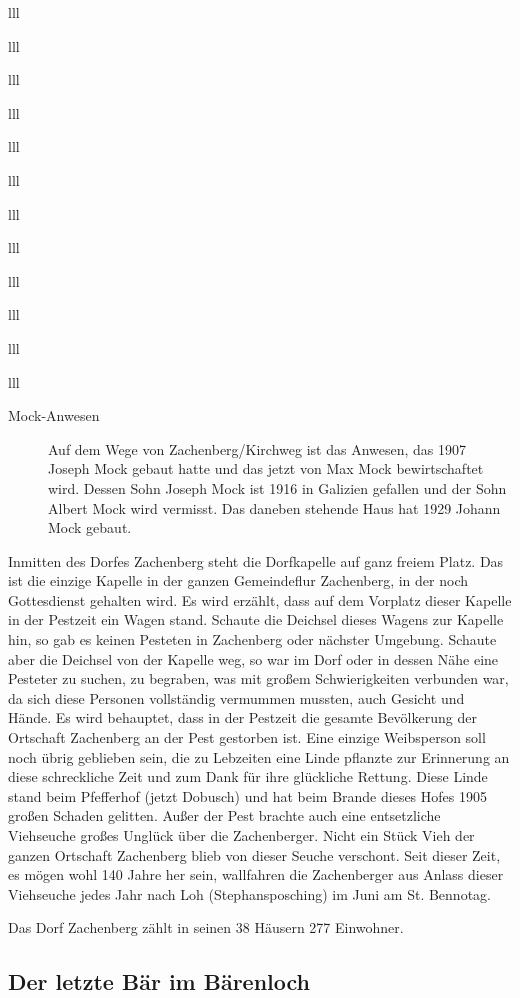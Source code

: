 \documentclass[12pt,a4pager]{book}
\begin{document}
\begin{tabuluar}{lll}
\begin{tabuluar}{lll}
\begin{tabuluar}{lll}
\begin{tabuluar}{lll}
\begin{tabuluar}{lll}
\begin{tabuluar}{lll}
\begin{tabuluar}{lll}
\begin{tabuluar}{lll}
\begin{tabuluar}{lll}
\begin{tabuluar}{lll}
\begin{tabuluar}{lll}
\begin{tabuluar}{lll}
\begin{description}
\item[Mock-Anwesen] Auf dem Wege von Zachenberg/Kirchweg ist das Anwesen, das
1907 Joseph Mock gebaut hatte und das jetzt von Max Mock bewirtschaftet wird.
Dessen Sohn Joseph Mock ist 1916 in Galizien gefallen und der Sohn Albert Mock
wird vermisst. Das daneben stehende Haus hat 1929 Johann Mock gebaut.
\end{description}

Inmitten des Dorfes Zachenberg steht die Dorfkapelle auf ganz freiem Platz. Das
ist die einzige Kapelle in der ganzen Gemeindeflur Zachenberg, in der noch
Gottesdienst gehalten wird. Es wird erzählt, dass auf dem Vorplatz dieser
Kapelle in der Pestzeit ein Wagen stand. Schaute die Deichsel dieses Wagens zur
Kapelle hin, so gab es keinen Pesteten in Zachenberg oder nächster Umgebung.
Schaute aber die Deichsel von der Kapelle weg, so war im Dorf oder in dessen
Nähe eine Pesteter zu suchen, zu begraben, was mit großem Schwierigkeiten
verbunden war, da sich diese Personen vollständig vermummen mussten, auch
Gesicht und Hände. Es wird behauptet, dass in der Pestzeit die gesamte
Bevölkerung der Ortschaft Zachenberg an der Pest gestorben ist. Eine einzige
Weibsperson soll noch übrig geblieben sein, die zu Lebzeiten eine Linde pflanzte
zur Erinnerung an diese schreckliche Zeit und zum Dank für ihre glückliche
Rettung. Diese Linde stand beim Pfefferhof (jetzt Dobusch) und hat beim Brande
dieses Hofes 1905 großen Schaden gelitten. Außer der Pest brachte auch eine
entsetzliche Viehseuche großes Unglück über die Zachenberger. Nicht ein Stück
Vieh der ganzen Ortschaft Zachenberg blieb von dieser Seuche verschont. Seit
dieser Zeit, es mögen wohl 140 Jahre her sein, wallfahren die Zachenberger aus
Anlass dieser Viehseuche jedes Jahr nach Loh (Stephansposching) im Juni am St.
Bennotag.

Das Dorf Zachenberg zählt in seinen 38 Häusern 277 Einwohner.

\subsection{Der letzte Bär im Bärenloch}


\end{tabuluar}
\end{tabuluar}
\end{tabuluar}
\end{tabuluar}
\end{tabuluar}
\end{tabuluar}
\end{tabuluar}
\end{tabuluar}
\end{tabuluar}
\end{tabuluar}
\end{tabuluar}
\end{tabuluar}
\end{document}
